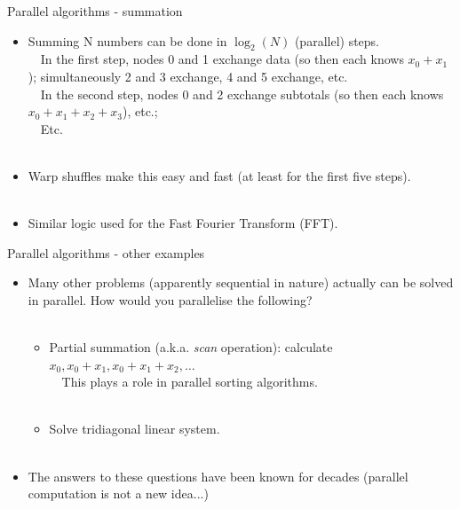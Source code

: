 \documentclass[usenames,dvipsnames]{beamer}
\begin{document}
\begin{frame}{Parallel algorithms - summation}
  \begin{block}{}
    \begin{itemize}
      \item{Summing N numbers can be done in $\log_2(N)$ (parallel) steps.\\~\
      In the first step, nodes 0 and 1 exchange data (so then each knows $x_0 + x_1$); simultaneously 2 and 3 exchange, 4 and 5 exchange, etc.\\~\
      In the second step, nodes 0 and 2 exchange subtotals (so then each knows $x_0 + x_1 + x_2 + x_3$), etc.;\\~\
      Etc.}\\~\
      \item{Warp shuffles make this easy and fast (at least for the first five steps).}\\~\
      \item{Similar logic used for the Fast Fourier Transform (FFT).}
    \end{itemize}
  \end{block}
\end{frame}

\begin{frame}{Parallel algorithms - other examples}
  \begin{block}{}
    \begin{itemize}
      \item{Many other problems (apparently sequential in nature) actually can be solved in parallel. How would you parallelise the following?}\\~\
      \begin{itemize}
        \item{Partial summation (a.k.a. \textit{scan} operation): calculate $x_0, x_0+x_1, x_0+x_1+x_2, \ldots$\\~\ This plays a role in parallel sorting algorithms.}\\~\
        \item{Solve tridiagonal linear system.}\\~\
      \end{itemize}
      \item{The answers to these questions have been known for decades (parallel computation is not a new idea...)}
    \end{itemize}
  \end{block}
\end{frame}
\end{document}
